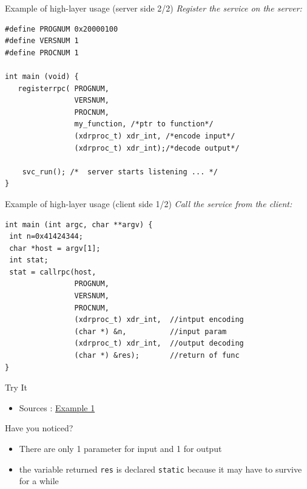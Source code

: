\documentclass[bigger,hyperref={colorlinks=true, urlcolor=red, plainpages=false, pdfpagelabels, bookmarksnumbered}]{beamer}
\begin{document}
\begin{frame}[fragile,label=sec-2-12]{Example of high-layer usage (server side 2/2)}
 \emph{Register the service on the server:}
\lstset{language=C,label= ,caption= ,numbers=none}
\begin{lstlisting}
#define PROGNUM 0x20000100                                                      
#define VERSNUM 1                                                               
#define PROCNUM 1

int main (void) {
   registerrpc( PROGNUM,
                VERSNUM,
                PROCNUM,
                my_function, /*ptr to function*/
                (xdrproc_t) xdr_int, /*encode input*/
                (xdrproc_t) xdr_int);/*decode output*/

    svc_run(); /*  server starts listening ... */
}
\end{lstlisting}
\end{frame}

\begin{frame}[fragile,label=sec-2-13]{Example of high-layer usage (client side 1/2)}
 \emph{Call the service from the client:}
\lstset{language=C,label= ,caption= ,numbers=none}
\begin{lstlisting}
int main (int argc, char **argv) {
 int n=0x41424344;
 char *host = argv[1];
 int stat;
 stat = callrpc(host,
                PROGNUM,
                VERSNUM,
                PROCNUM,
                (xdrproc_t) xdr_int,  //intput encoding
                (char *) &n,          //input param
                (xdrproc_t) xdr_int,  //output decoding
                (char *) &res);       //return of func
}
\end{lstlisting}
\end{frame}


\begin{frame}[fragile,label=sec-2-14]{Try It}
 \begin{itemize}
\item Sources : \href{http://icps.u-strasbg.fr/~genaud/courses/sd/src/rpc/example_1.tar.gz}{Example 1}
\end{itemize}

\begin{block}{Have you noticed?}
\begin{itemize}
\item There are only \alert{1} parameter for input and \alert{1} for output
\item the variable returned \texttt{res} is declared \texttt{static} because it may have to survive for a while
\end{itemize}
\end{block}
\end{frame}
\end{document}

